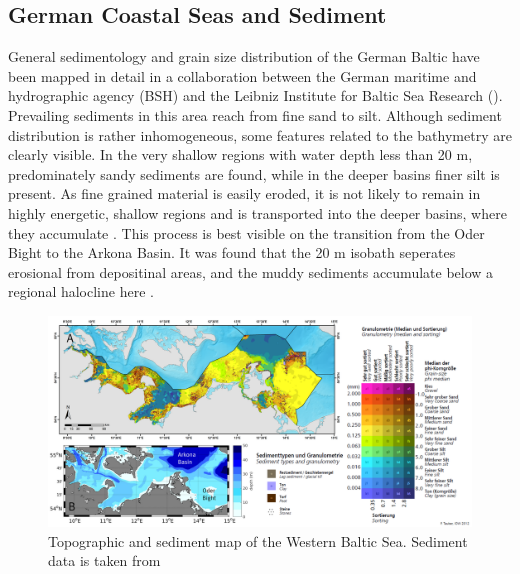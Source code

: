 \subsection{German Coastal Seas and Sediment}

General sedimentology and grain size distribution of the German Baltic have 
been mapped in detail in a collaboration between the German maritime and 
hydrographic agency (BSH) and the Leibniz Institute for Baltic Sea Research 
(). Prevailing sediments in this area reach from 
fine sand to silt. Although sediment distribution is rather inhomogeneous, some 
features related to the bathymetry are clearly visible. In the very shallow 
regions with water depth less than 20 m, predominately sandy sediments are 
found, while in the deeper basins finer silt is present.
As fine grained material is easily eroded, it is not likely to remain in highly 
energetic, shallow regions and is transported into the deeper basins, where 
they accumulate \citep[][]{basys1}. This process is best visible on the 
transition from the Oder Bight to the Arkona Basin. It was found that the 20 m 
isobath seperates erosional from depositinal areas, and the muddy sediments 
accumulate below a regional halocline here \citep[][]{basys2}.

\begin{figure}[ht]
 \flushleft
 \includegraphics[width=17cm]{bilder/sediment.pdf}
 \caption{Topographic and sediment map of the Western Baltic 
Sea. Sediment data is taken from \citep[][]{tauber20xx}}\label{westernbaltic}
\end{figure}